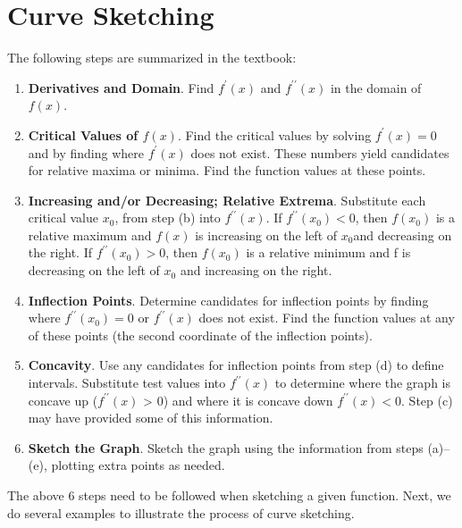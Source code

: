 \documentclass[
]{book}
\begin{document}
\hfill\break

\hypertarget{curve-sketching}{%
\section{Curve Sketching}\label{curve-sketching}}

The following steps are summarized in the textbook:

\hfill\break

\begin{enumerate}
\def\labelenumi{\alph{enumi}.}
\item
  \textbf{Derivatives and Domain}. Find \(f^\prime(x)\) and \(f^{\prime\prime}(x)\) in the domain of \(f(x)\).
\item
  \textbf{Critical Values of \(f(x)\)}. Find the critical values by solving \(f^\prime(x) = 0\) and by finding where \(f^\prime(x)\) does not exist. These numbers yield candidates for relative maxima or minima. Find the function values at these points.
\item
  \textbf{Increasing and/or Decreasing; Relative Extrema}. Substitute each critical value \(x_0\), from step (b) into \(f^{\prime\prime}(x)\). If \(f^{\prime\prime}(x_0) < 0\), then \(f(x_0)\) is a relative maximum and \(f(x)\) is increasing on the left of \(x_0\)and decreasing on the right. If \(f^{\prime\prime}(x_0) > 0\), then \(f(x_0)\) is a relative minimum and f is decreasing on the left of \(x_0\) and increasing on the right.
\item
  \textbf{Inflection Points}. Determine candidates for inflection points by finding where \(f^{\prime\prime}(x_0) = 0\) or \(f^{\prime\prime}(x)\) does not exist. Find the function values at any of these points (the second coordinate of the inflection points).
\item
  \textbf{Concavity}. Use any candidates for inflection points from step (d) to define intervals. Substitute test values into \(f^{\prime\prime}(x)\) to determine where the graph is concave up
  (\(f^{\prime\prime}(x)\) \textgreater{} 0) and where it is concave down \(f^{\prime\prime}(x) < 0\). Step (c) may have provided some of this information.
\item
  \textbf{Sketch the Graph}. Sketch the graph using the information from steps (a)--(e), plotting extra points as needed.
\end{enumerate}

The above 6 steps need to be followed when sketching a given function. Next, we do several examples to illustrate the process of curve sketching.
\end{document}
